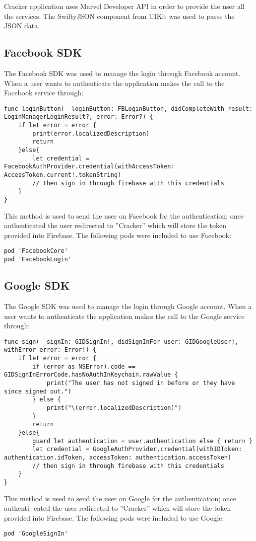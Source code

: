 Cracker application uses Marvel Developer API in order to provide the user all the services. The SwiftyJSON component from UIKit was used to parse the JSON data.
\subsection{Facebook SDK}

The Facebook SDK was used to manage the login through Facebook account. When a user wants to authenticate the application makes the call to the Facebook service through:
\begin{lstlisting}
func loginButton(_ loginButton: FBLoginButton, didCompleteWith result: LoginManagerLoginResult?, error: Error?) {
	if let error = error {
		print(error.localizedDescription)
		return
	}else{
		let credential = FacebookAuthProvider.credential(withAccessToken: AccessToken.current!.tokenString)
		// then sign in through firebase with this credentials
	} 
}
\end{lstlisting}

This method is used to send the user on Facebook for the authentication; once authenticated the user redirected to ”Cracker” which will store the token provided into Firebase.
The following pods were included to use Facebook:

\begin{lstlisting}
pod 'FacebookCore'
pod 'FacebookLogin'
\end{lstlisting}

\clearpage
  
  
\subsection{Google SDK}
The Google SDK was used to manage the login through Google account. When a user wants to authenticate the application makes the call to the Google service through:
\begin{lstlisting}
func sign(_ signIn: GIDSignIn!, didSignInFor user: GIDGoogleUser!, withError error: Error!) {
	if let error = error {
		if (error as NSError).code == GIDSignInErrorCode.hasNoAuthInKeychain.rawValue {
			print("The user has not signed in before or they have since signed out.")
		} else {
			print("\(error.localizedDescription)")
		}
		return
	}else{
		guard let authentication = user.authentication else { return }
		let credential = GoogleAuthProvider.credential(withIDToken: authentication.idToken, accessToken: authentication.accessToken)
		// then sign in through firebase with this credentials
	}
}
\end{lstlisting}
This method is used to send the user on Google for the authentication; once authenti- cated the user redirected to ”Cracker” which will store the token provided into Firebase.
The following pods were included to use Google:
\begin{lstlisting}
pod 'GoogleSignIn'
\end{lstlisting}
    
